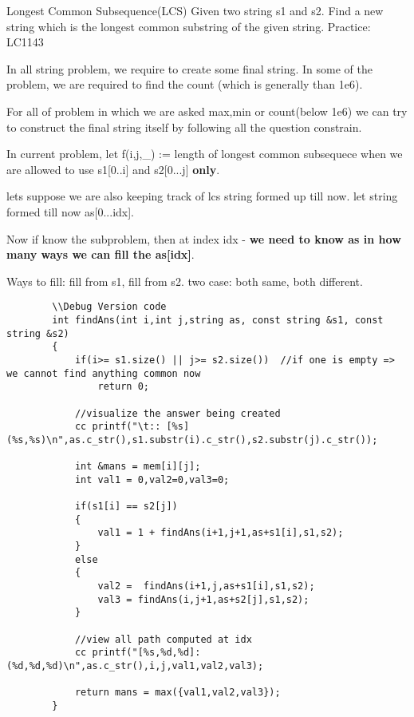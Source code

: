 
\begin{problem}{Longest Common Subsequence(LCS)}
    Given two string s1 and s2. Find a new string which is the longest common substring of the given string.
    Practice: LC1143
\end{problem}

\begin{solution}
    \obeylines
    In all string problem, we require to create some final string.
    In some of the problem, we are required to find the count (which is generally than 1e6).

    \medskip
    For all of problem in which we are asked max,min or count(below 1e6) we can try to construct the final string itself by following all the question constrain.

    \bigskip
    In current problem, let f(i,j,\_) := length of longest common subsequece when we are allowed to use s1[0..i] and s2[0...j] \textbf{only}.

    lets suppose we are also keeping track of lcs string formed up till now. let string formed till now as[0...idx].

    \medskip
    Now if know the subproblem, then at index idx - \textbf {we need to know as in how many ways we can fill the as[idx]}.

    \medskip
    Ways to fill:
    fill from s1, fill from s2. 
    two case: both same, both different.

   
    \begin{verbatim}
        \\Debug Version code
        int findAns(int i,int j,string as, const string &s1, const string &s2)
        {
            if(i>= s1.size() || j>= s2.size())  //if one is empty => we cannot find anything common now
                return 0; 
                
            //visualize the answer being created
            cc printf("\t:: [%s] (%s,%s)\n",as.c_str(),s1.substr(i).c_str(),s2.substr(j).c_str()); 
            
            int &mans = mem[i][j];
            int val1 = 0,val2=0,val3=0;
            
            if(s1[i] == s2[j])
            {
                val1 = 1 + findAns(i+1,j+1,as+s1[i],s1,s2);
            }
            else
            {
                val2 =  findAns(i+1,j,as+s1[i],s1,s2);
                val3 = findAns(i,j+1,as+s2[j],s1,s2);
            }
            
            //view all path computed at idx
            cc printf("[%s,%d,%d]: (%d,%d,%d)\n",as.c_str(),i,j,val1,val2,val3); 
            
            return mans = max({val1,val2,val3});
        }
    \end{verbatim}

\end{solution}

